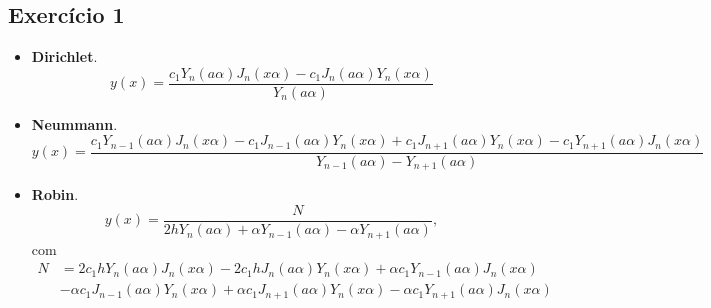 \documentclass[10pt,a4paper]{article}
\begin{document}
	\subsection*{Exercício 1}
	\begin{itemize}
		\item \textbf{Dirichlet}. \[y(x)= \frac{c_1 Y_n(a \alpha ) J_n(x \alpha )-c_1 J_n(a \alpha ) Y_n(x \alpha )}{Y_n(a \alpha )}\]
		\item \textbf{Neummann}. \[y(x)= \frac{c_1 Y_{n-1}(a \alpha ) J_n(x \alpha )-c_1 J_{n-1}(a \alpha ) Y_n(x \alpha )+c_1 J_{n+1}(a \alpha ) Y_n(x \alpha )-c_1 Y_{n+1}(a \alpha ) J_n(x \alpha )}{Y_{n-1}(a \alpha )-Y_{n+1}(a \alpha )}\]
		\item \textbf{Robin}. \[y(x)= \frac{N}{2 h Y_n(a \alpha )+\alpha  Y_{n-1}(a \alpha )-\alpha  Y_{n+1}(a \alpha )},\]
		com
		\begin{align*}
			N &= 2 c_1 h Y_n(a \alpha ) J_n(x \alpha )-2 c_1 h J_n(a \alpha ) Y_n(x \alpha )+\alpha  c_1 Y_{n-1}(a \alpha ) J_n(x \alpha )\\
			&-\alpha  c_1 J_{n-1}(a \alpha ) Y_n(x \alpha )+\alpha  c_1 J_{n+1}(a \alpha ) Y_n(x \alpha )-\alpha  c_1 Y_{n+1}(a \alpha ) J_n(x \alpha )
		\end{align*}
	\end{itemize}
	
\end{document}
